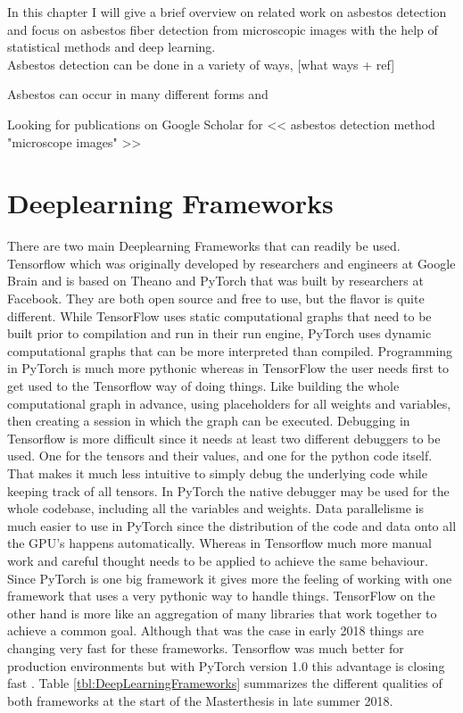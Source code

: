 In this chapter I will give a brief overview on related work on asbestos detection and focus on asbestos fiber detection from microscopic images with the help of statistical methods and deep learning. \\




Asbestos detection can be done in a variety of ways, [what ways + ref]

Asbestos can occur in many different forms and 

Looking for publications on Google Scholar for << asbestos detection method "microscope images" >>

\section{Deeplearning Frameworks}

There are two main Deeplearning Frameworks that can readily be used. Tensorflow \cite{tensorflow} which was originally developed by researchers and engineers at Google Brain and is based on Theano and PyTorch \cite{pytorch} that was built by researchers at Facebook. They are both open source and free to use, but the flavor is quite different. While TensorFlow uses static computational graphs that need to be built prior to compilation and run in their run engine, PyTorch uses dynamic computational graphs that can be more interpreted than compiled. Programming in PyTorch is much more pythonic whereas in TensorFlow the user needs first to get used to the Tensorflow way of doing things. Like building the whole computational graph in advance, using placeholders for all weights and variables, then creating a session in which the graph can be executed. Debugging in Tensorflow is more difficult since it needs at least two different debuggers to be used. One for the tensors and their values, and one for the python code itself. That makes it much less intuitive to simply debug the underlying code while keeping track of all tensors. In PyTorch the native debugger may be used for the whole codebase, including all the variables and weights. Data parallelisme is much easier to use in PyTorch since the distribution of the code and data onto all the GPU's happens automatically. Whereas in Tensorflow much more manual work and careful thought needs to be applied to achieve the same behaviour. Since PyTorch is one big framework it gives more the feeling of working with one framework that uses a very pythonic way to handle things. TensorFlow on the other hand is more like an aggregation of many libraries that work together to achieve a common goal. Although that was the case in early 2018 things are changing very fast for these frameworks. Tensorflow was much better for production environments but with PyTorch version 1.0 this advantage is closing fast \cite{pytorchOnePointZero}. Table \ref{tbl:DeepLearningFrameworks} summarizes the different qualities of  both frameworks at the start of the Masterthesis in late summer 2018. \\

